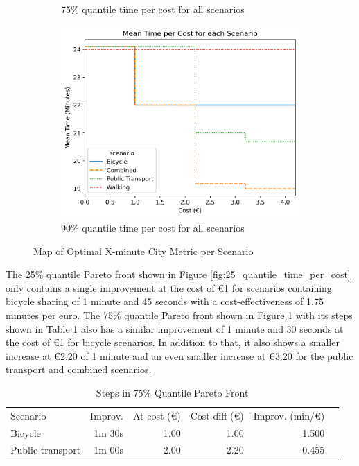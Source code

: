 \begin{figure}
\begin{subfigure}[b]{0.48\textwidth}
         \caption{75\% quantile time per cost for all scenarios}
         \label{fig:75_quantile_time_per_cost}
     \end{subfigure}
     \hfill
     \begin{subfigure}[b]{0.48\textwidth}
         \centering
         \includegraphics[width=\textwidth]{Figures/results/metric_cost/quantile_90_time_per_cost_for_each_scenario_without_car.png}
         \caption{90\% quantile time per cost for all scenarios}
         \label{fig:90_quantile_time_per_cost}
     \end{subfigure}
        \caption{Map of Optimal X-minute City Metric per Scenario}
        \label{fig:quantile_time_per_cost}
\end{figure}
The 25\% quantile Pareto front shown in Figure \ref{fig:25_quantile_time_per_cost} only contains a single improvement at the cost of \euro{1} for scenarios containing bicycle sharing of 1 minute and 45 seconds with a cost-effectiveness of 1.75 minutes per euro.
The 75\% quantile Pareto front shown in Figure \ref{fig:75_quantile_time_per_cost} with its steps shown in Table \ref{tab:differences_in_75_quantile_pareto_front} also has a similar improvement of 1 minute and 30 seconds at the cost of \euro{1} for bicycle scenarios.
In addition to that, it also shows a smaller increase at \euro{2.20} of 1 minute and an even smaller increase at \euro{3.20} for the public transport and combined scenarios.
\begin{table}
  \caption{Steps in 75\% Quantile Pareto Front}
  \label{tab:differences_in_75_quantile_pareto_front}
  \begin{center}
    \begin{tabular}{lrrrrl}
     Scenario & Improv. & At cost (\euro) & Cost diff (\euro) & Improv. (min/\euro) \\
     Bicycle & 1m 30s & 1.00 & 1.00 & 1.500 \\
     Public transport & 1m 00s & 2.00 & 2.20 & 0.455 \\
    \end{tabular}
  \end{center}
\end{table}
